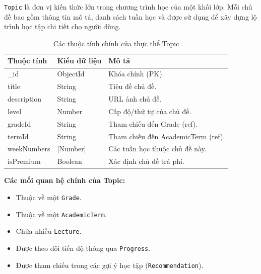 \texttt{Topic} là đơn vị kiến thức lớn trong chương trình học của một khối lớp. 
Mỗi chủ đề bao gồm thông tin mô tả, danh sách tuần học và được sử dụng để xây dựng lộ trình học tập chi tiết cho người dùng.
\begin{table}[H]
	\centering
	\begin{tabularx}{\textwidth}{|l|l|X|}
		\hline
		\textbf{Thuộc tính} & \textbf{Kiểu dữ liệu} & \textbf{Mô tả} \\ \hline
		\_id & ObjectId & Khóa chính (PK). \\ \hline
		title & String & Tiêu đề chủ đề. \\ \hline
		description & String & URL ảnh chủ đề. \\ \hline
		level & Number & Cấp độ/thứ tự của chủ đề. \\ \hline
		gradeId & String & Tham chiếu đến Grade (ref). \\ \hline
		termId & String & Tham chiếu đến AcademicTerm (ref). \\ \hline
		weekNumbers & [Number] & Các tuần học thuộc chủ đề này. \\ \hline
		isPremium & Boolean & Xác định chủ đề trả phí. \\ \hline
	\end{tabularx}
	\caption{Các thuộc tính chính của thực thể Topic}
\end{table}
\newline
\textbf{Các mối quan hệ chính của Topic:}
\begin{itemize}
	\item Thuộc về một \texttt{Grade}.
	\item Thuộc về một \texttt{AcademicTerm}.
	\item Chứa nhiều \texttt{Lecture}.
	\item Được theo dõi tiến độ thông qua \texttt{Progress}.
	\item Được tham chiếu trong các gợi ý học tập (\texttt{Recommendation}).
\end{itemize}

